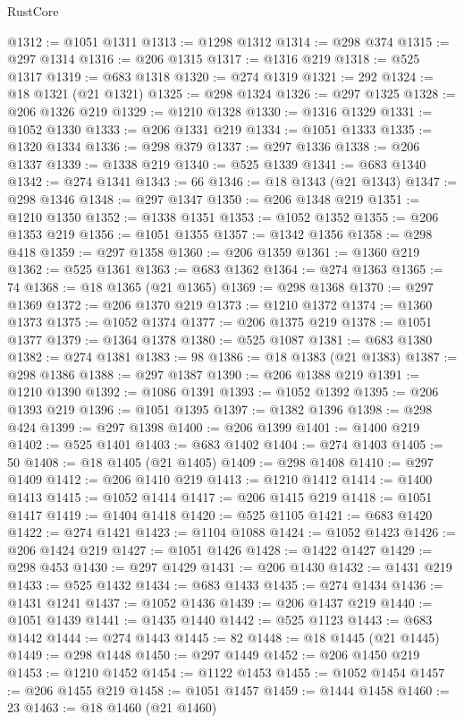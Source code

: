\begin{lexlean}{RustCore}
\begin{coremodule}
@1312 := @1051 @1311
@1313 := @1298 @1312
@1314 := @298 @374
@1315 := @297 @1314
@1316 := @206 @1315
@1317 := @1316 @219
@1318 := @525 @1317
@1319 := @683 @1318
@1320 := @274 @1319
@1321 := 292
@1324 := @18 @1321 (@21 @1321)
@1325 := @298 @1324
@1326 := @297 @1325
@1328 := @206 @1326 @219
@1329 := @1210 @1328
@1330 := @1316 @1329
@1331 := @1052 @1330
@1333 := @206 @1331 @219
@1334 := @1051 @1333
@1335 := @1320 @1334
@1336 := @298 @379
@1337 := @297 @1336
@1338 := @206 @1337
@1339 := @1338 @219
@1340 := @525 @1339
@1341 := @683 @1340
@1342 := @274 @1341
@1343 := 66
@1346 := @18 @1343 (@21 @1343)
@1347 := @298 @1346
@1348 := @297 @1347
@1350 := @206 @1348 @219
@1351 := @1210 @1350
@1352 := @1338 @1351
@1353 := @1052 @1352
@1355 := @206 @1353 @219
@1356 := @1051 @1355
@1357 := @1342 @1356
@1358 := @298 @418
@1359 := @297 @1358
@1360 := @206 @1359
@1361 := @1360 @219
@1362 := @525 @1361
@1363 := @683 @1362
@1364 := @274 @1363
@1365 := 74
@1368 := @18 @1365 (@21 @1365)
@1369 := @298 @1368
@1370 := @297 @1369
@1372 := @206 @1370 @219
@1373 := @1210 @1372
@1374 := @1360 @1373
@1375 := @1052 @1374
@1377 := @206 @1375 @219
@1378 := @1051 @1377
@1379 := @1364 @1378
@1380 := @525 @1087
@1381 := @683 @1380
@1382 := @274 @1381
@1383 := 98
@1386 := @18 @1383 (@21 @1383)
@1387 := @298 @1386
@1388 := @297 @1387
@1390 := @206 @1388 @219
@1391 := @1210 @1390
@1392 := @1086 @1391
@1393 := @1052 @1392
@1395 := @206 @1393 @219
@1396 := @1051 @1395
@1397 := @1382 @1396
@1398 := @298 @424
@1399 := @297 @1398
@1400 := @206 @1399
@1401 := @1400 @219
@1402 := @525 @1401
@1403 := @683 @1402
@1404 := @274 @1403
@1405 := 50
@1408 := @18 @1405 (@21 @1405)
@1409 := @298 @1408
@1410 := @297 @1409
@1412 := @206 @1410 @219
@1413 := @1210 @1412
@1414 := @1400 @1413
@1415 := @1052 @1414
@1417 := @206 @1415 @219
@1418 := @1051 @1417
@1419 := @1404 @1418
@1420 := @525 @1105
@1421 := @683 @1420
@1422 := @274 @1421
@1423 := @1104 @1088
@1424 := @1052 @1423
@1426 := @206 @1424 @219
@1427 := @1051 @1426
@1428 := @1422 @1427
@1429 := @298 @453
@1430 := @297 @1429
@1431 := @206 @1430
@1432 := @1431 @219
@1433 := @525 @1432
@1434 := @683 @1433
@1435 := @274 @1434
@1436 := @1431 @1241
@1437 := @1052 @1436
@1439 := @206 @1437 @219
@1440 := @1051 @1439
@1441 := @1435 @1440
@1442 := @525 @1123
@1443 := @683 @1442
@1444 := @274 @1443
@1445 := 82
@1448 := @18 @1445 (@21 @1445)
@1449 := @298 @1448
@1450 := @297 @1449
@1452 := @206 @1450 @219
@1453 := @1210 @1452
@1454 := @1122 @1453
@1455 := @1052 @1454
@1457 := @206 @1455 @219
@1458 := @1051 @1457
@1459 := @1444 @1458
@1460 := 23
@1463 := @18 @1460 (@21 @1460)

\end{coremodule}
\end{lexlean}
